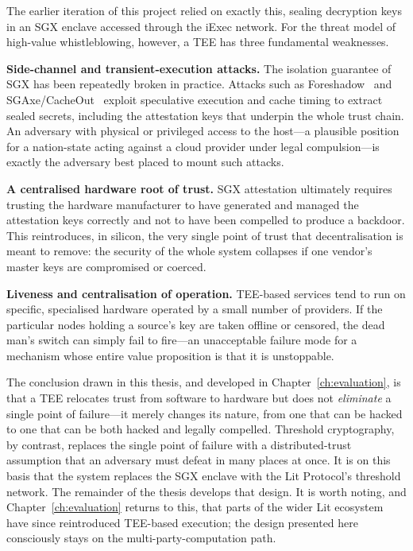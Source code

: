 The earlier iteration of this project relied on exactly this, sealing decryption
keys in an SGX enclave accessed through the iExec network. For the threat model of
high-value whistleblowing, however, a TEE has three fundamental weaknesses.

\textbf{Side-channel and transient-execution attacks.} The isolation guarantee of
SGX has been repeatedly broken in practice. Attacks such as
Foreshadow~\cite{vanbulck2018foreshadow} and SGAxe/CacheOut~\cite{vanschaik2020sgaxe}
exploit speculative execution and cache timing to extract sealed secrets,
including the attestation keys that underpin the whole trust chain. An adversary
with physical or privileged access to the host---a plausible position for a
nation-state acting against a cloud provider under legal compulsion---is exactly
the adversary best placed to mount such attacks.

\textbf{A centralised hardware root of trust.} SGX attestation ultimately
requires trusting the hardware manufacturer to have generated and managed the
attestation keys correctly and not to have been compelled to produce a backdoor.
This reintroduces, in silicon, the very single point of trust that
decentralisation is meant to remove: the security of the whole system collapses
if one vendor's master keys are compromised or coerced.

\textbf{Liveness and centralisation of operation.} TEE-based services tend to run
on specific, specialised hardware operated by a small number of providers. If the
particular nodes holding a source's key are taken offline or censored, the dead
man's switch can simply fail to fire---an unacceptable failure mode for a
mechanism whose entire value proposition is that it is unstoppable.

The conclusion drawn in this thesis, and developed in Chapter~\ref{ch:evaluation},
is that a TEE relocates trust from software to hardware but does not
\emph{eliminate} a single point of failure---it merely changes its nature, from
one that can be hacked to one that can be both hacked and legally compelled.
Threshold cryptography, by contrast, replaces the single point of failure with a
distributed-trust assumption that an adversary must defeat in many places at once.
It is on this basis that the system replaces the SGX enclave with the Lit
Protocol's threshold network. The remainder of the thesis develops that design.
It is worth noting, and Chapter~\ref{ch:evaluation} returns to this, that parts
of the wider Lit ecosystem have since reintroduced TEE-based execution; the design
presented here consciously stays on the multi-party-computation path.
